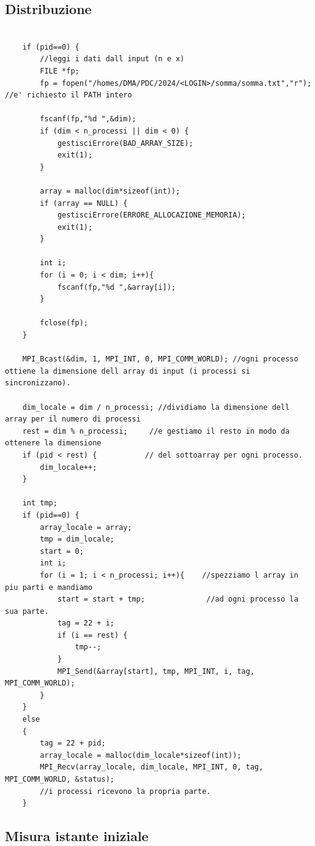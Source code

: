 \documentclass{article}
\begin{document}
\subsection{Distribuzione}

\begin{lstlisting}

    if (pid==0) {
        //leggi i dati dall input (n e x)
        FILE *fp;
        fp = fopen("/homes/DMA/PDC/2024/<LOGIN>/somma/somma.txt","r"); //e' richiesto il PATH intero

        fscanf(fp,"%d ",&dim);
        if (dim < n_processi || dim < 0) {
            gestisciErrore(BAD_ARRAY_SIZE);
            exit(1);
        }

        array = malloc(dim*sizeof(int));
        if (array == NULL) {
            gestisciErrore(ERRORE_ALLOCAZIONE_MEMORIA);
            exit(1);
        }
        
        int i;
        for (i = 0; i < dim; i++){
            fscanf(fp,"%d ",&array[i]);
        }
        
        fclose(fp);
    }

    MPI_Bcast(&dim, 1, MPI_INT, 0, MPI_COMM_WORLD); //ogni processo ottiene la dimensione dell array di input (i processi si sincronizzano).

    dim_locale = dim / n_processi; //dividiamo la dimensione dell array per il numero di processi 
    rest = dim % n_processi;     //e gestiamo il resto in modo da ottenere la dimensione
    if (pid < rest) {           // del sottoarray per ogni processo.
        dim_locale++;
    }

    int tmp;
    if (pid==0) {
        array_locale = array;
        tmp = dim_locale;
        start = 0;
        int i;
	    for (i = 1; i < n_processi; i++){    //spezziamo l array in piu parti e mandiamo
            start = start + tmp;              //ad ogni processo la sua parte.
            tag = 22 + i;
            if (i == rest) {	
                tmp--;
		    }
            MPI_Send(&array[start], tmp, MPI_INT, i, tag, MPI_COMM_WORLD);
        }
    }
    else
    {
        tag = 22 + pid;
        array_locale = malloc(dim_locale*sizeof(int));
	    MPI_Recv(array_locale, dim_locale, MPI_INT, 0, tag, MPI_COMM_WORLD, &status);  
        //i processi ricevono la propria parte.
    }
\end{lstlisting}

\subsection{Misura istante iniziale}
\end{document}
